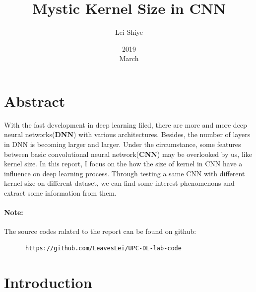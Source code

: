 \documentclass[a4paper,10pt]{article}
\begin{document}
%
   \title{Mystic Kernel Size in CNN}

   \author{Lei Shiye}
          
   \date{2019\\ March}

   \maketitle
 
  \newpage
    
\hypersetup{colorlinks=true, bookmarks, unicode}
\section*{Abstract}
With the fast development in deep learning filed, there are more and more deep 
neural networks(\textbf{DNN}) with various architectures. Besides, the number of 
layers in DNN is becoming larger and larger. Under the circumstance, some features 
between basic convolutional neural network(\textbf{CNN}) may be overlooked by us, 
like kernel size. In this report, I focus on the how the size of kernel in CNN have
a influence on deep learning process. Through testing a same CNN with different 
kernel size on different dataset, we can find some interest phenomenons and extract
some information from them. 


\paragraph{Note:}
The source codes ralated to the report can be found on github:
\begin{verbatim} 
      https://github.com/LeavesLei/UPC-DL-lab-code
\end{verbatim}

\section{Introduction}
\end{document}
